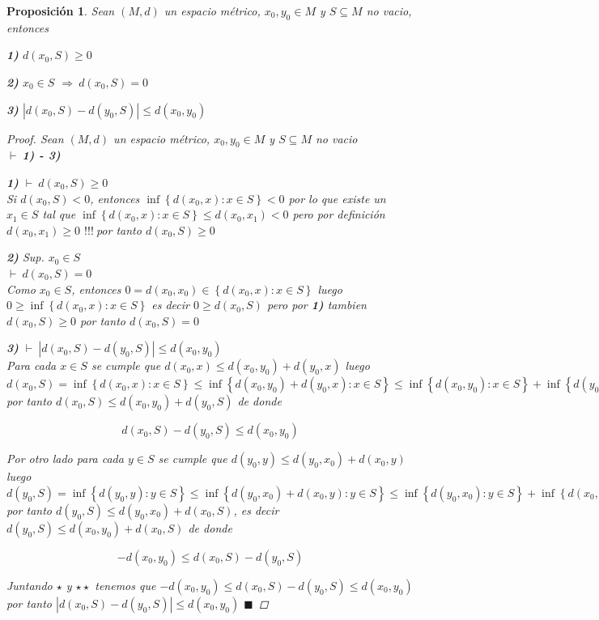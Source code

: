\documentclass[oneside]{book} %
\theoremstyle{Teorema}
\newtheorem{Proposicion}[Definicion]{Proposición}
\theoremstyle{Ejemplos}
\theoremstyle{[Obs]}
\newcommand{\abs}[1]{\left|#1\right|} %
\renewcommand{\{}{\left\lbrace} %
\renewcommand{\}}{\right\rbrace} %
\renewcommand{\sc}{\subseteq} %
\renewcommand{\qed}{$\blacksquare$} %
\newcommand{\pd}{$\vdash\ $} %
\renewcommand{\c}{$!!!\ $} %
\newcommand{\Imp}{$\Rightarrow\ $} %
\begin{document}
			\begin{Proposicion}\setlength{\parindent}{0em}
				
				Sean $(M, d)$ un espacio métrico, $x_0, y_0 \in M$ y $S \sc M$ no vacio, entonces 
				
				\textbf{1)} $d(x_0, S) \geq 0$ 

				\textbf{2)} $x_0 \in S$ \Imp $d(x_0, S) = 0$ 

				\textbf{3)} $\abs{d(x_0, S) - d(y_0, S)} \leq d(x_0, y_0)$ 

				\begin{proof}
					
					Sean $(M, d)$ un espacio métrico, $x_0, y_0 \in M$ y $S \sc M$ no vacio \\
					\pd \textbf{1) - 3)} 

					\textbf{1)} \pd $d(x_0, S) \geq 0$ \\
					Si $d(x_0, S) < 0$, entonces $\inf\{ d(x_0, x) : x \in S \} < 0$ por lo que existe un $x_1 \in S$ tal que $\inf\{ d(x_0, x) : x \in S \} \leq d(x_0, x_1) < 0$ pero por definición $d(x_0, x_1) \geq 0$ \c por tanto $d(x_0, S) \geq 0$

					\textbf{2)} Sup. $x_0 \in S$ \\
					\pd $d(x_0, S) = 0$ \\
					Como $x_0 \in S$, entonces $0 = d(x_0, x_0) \in \{ d(x_0, x) : x \in S \}$ luego $0 \geq \inf\{ d(x_0, x) : x \in S \}$ es decir $0 \geq d(x_0, S)$ pero por \textbf{1)} tambien $d(x_0, S) \geq 0$ por tanto $d(x_0, S) = 0$

					\textbf{3)} \pd $\abs{d(x_0, S) - d(y_0, S)} \leq d(x_0, y_0)$ \\
					Para cada $x \in S$ se cumple que $d(x_0, x) \leq d(x_0, y_0) + d(y_0, x)$ luego $d(x_0, S) = \inf\{ d(x_0, x) : x \in S \} \leq \inf\{ d(x_0, y_0) + d(y_0, x) : x \in S \} \leq \inf\{ d(x_0, y_0) : x \in S \} + \inf\{ d(y_0, x) : x \in S \} = d(x_0, y_0) + d(y_0, S)$ por tanto $d(x_0, S) \leq d(x_0, y_0) + d(y_0, S)$ de donde

					\begin{equation}\tag{$\star$}
						d(x_0, S) - d(y_0, S) \leq d(x_0, y_0)
					\end{equation}

					Por otro lado para cada $y \in S$ se cumple que $d(y_0, y) \leq d(y_0, x_0) + d(x_0, y)$ luego $d(y_0, S) = \inf\{ d(y_0, y) : y \in S \} \leq \inf\{ d(y_0, x_0) + d(x_0, y) : y \in S \} \leq \inf\{ d(y_0, x_0) : y \in S \} + \inf\{ d(x_0, y) : y \in S \} = d(y_0, x_0) + d(x_0, S)$ por tanto $d(y_0, S) \leq d(y_0, x_0) + d(x_0, S)$, es decir $d(y_0, S) \leq d(x_0, y_0) + d(x_0, S)$ de donde

					\begin{equation}\tag{$\star\star$}
						-d(x_0, y_0) \leq d(x_0, S) - d(y_0, S)
					\end{equation}

					Juntando $\star$ y $\star\star$ tenemos que $-d(x_0, y_0) \leq d(x_0, S) - d(y_0, S) \leq d(x_0, y_0)$ por tanto $\abs{d(x_0, S) - d(y_0, S)} \leq d(x_0, y_0)$ \qed

				\end{proof}

			\end{Proposicion}
\end{document}

